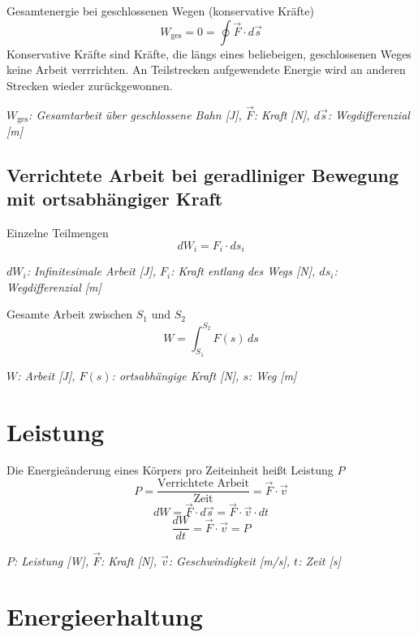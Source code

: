 \documentclass[a4paper,10pt]{article}
\newenvironment{displayformula}
{
	\begin{framed}
		\color{formulaColor}
	}
	{\end{framed}}
\newcommand{\formulalegend}[1]{%
	\par\vspace{0.5ex}%
	{{\color{legendColor}\RaggedRight\small\textit{#1}}}%
	\par\vspace{1.5ex}%
}
\begin{document}
\begin{displayformula}
	Gesamtenergie bei geschlossenen Wegen (konservative Kräfte)
	\[
	W_{\text{ges}} = 0 = \oint \vec{F} \cdot d\vec{s}
	\]
	Konservative Kräfte sind Kräfte, die längs eines beliebeigen, geschlossenen Weges keine Arbeit verrrichten. An Teilstrecken aufgewendete Energie wird an anderen Strecken wieder zurückgewonnen.
\end{displayformula}
\formulalegend{
	\( W_{\text{ges}} \): Gesamtarbeit über geschlossene Bahn [J], \( \vec{F} \): Kraft [N], \( d\vec{s} \): Wegdifferenzial [m]
}

\newpage

\subsection{Verrichtete Arbeit bei geradliniger Bewegung mit ortsabhängiger Kraft}

\begin{displayformula}
	Einzelne Teilmengen
	\[
	dW_i = F_i \cdot ds_i
	\]
\end{displayformula}
\formulalegend{
	\( dW_i \): Infinitesimale Arbeit [J], \( F_i \): Kraft entlang des Wegs [N], \( ds_i \): Wegdifferenzial [m]
}

\begin{displayformula}
	Gesamte Arbeit zwischen \( S_1 \) und \( S_2 \)
	\[
	W = \int_{S_1}^{S_2} F(s) \, ds
	\]
\end{displayformula}
\formulalegend{
	\( W \): Arbeit [J], \( F(s) \): ortsabhängige Kraft [N], \( s \): Weg [m]
}


\section{Leistung}

\begin{displayformula}
	Die Energieänderung eines Körpers pro Zeiteinheit heißt Leistung \( P \)
	\[
	P = \frac{\text{Verrichtete Arbeit}}{\text{Zeit}} = \vec{F} \cdot \vec{v}
	\]
	\[
	dW = \vec{F} \cdot d \vec{s} = \vec{F} \cdot \vec{v} \cdot dt
	\]
	\[
	\frac{dW}{dt} = \vec{F} \cdot \vec{v} = P
	\]
\end{displayformula}
\formulalegend{
	\( P \): Leistung [W], \( \vec{F} \): Kraft [N], \( \vec{v} \): Geschwindigkeit [m/s], \( t \): Zeit [s]
}

\section{Energieerhaltung}
\end{document}
